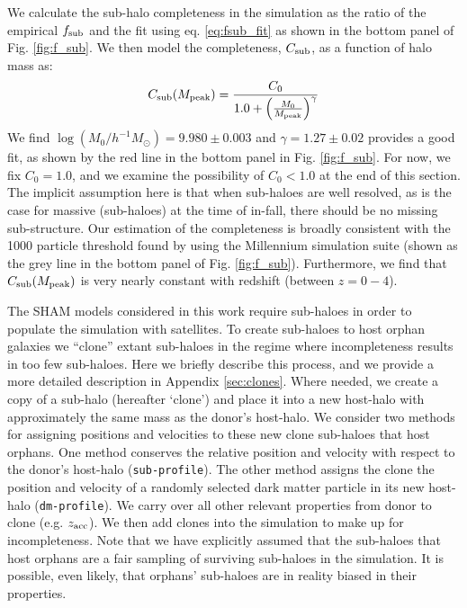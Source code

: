 \documentclass[useAMS,fleqn,usenatbib]{mnras}
\begin{document}
We calculate the sub-halo completeness in the simulation as the ratio of the empirical $f_{\rm sub}$ and the fit using eq. \ref{eq:fsub_fit} as shown in the bottom panel of Fig. \ref{fig:f_sub}.  We then model the completeness, $C_{\rm sub}$, as a function of halo mass as:
%
\begin{equation}
\label{eq:sub_completeness}
C_{\rm sub}(M_{\rm peak}) = \frac{C_0}{1.0 + \left(\frac{M_0}{M_{\rm peak}}\right)^{\gamma}}
\end{equation}
%
We find $\log(M_0/h^{-1}M_{\odot})=9.980\pm0.003$ and $\gamma=1.27 \pm 0.02$ provides a good fit, as shown by the red line in the bottom panel in Fig. \ref{fig:f_sub}.  For now, we fix $C_0=1.0$, and we examine the possibility of $C_0<1.0$ at the end of this section.  The implicit assumption here is that when sub-haloes are well resolved, as is the case for massive (sub-haloes) at the time of in-fall, there should be no missing sub-structure.  Our estimation of the completeness is broadly consistent with the 1000 particle threshold found by \citet{Guo:2013fm} using the Millennium simulation suite (shown as the grey line in the bottom panel of Fig. \ref{fig:f_sub}).  Furthermore, we find that $C_{\rm sub}(M_{\rm peak})$ is very nearly constant with redshift (between $z=0-4$).  

The SHAM models considered in this work require sub-haloes in order to populate the simulation with satellites.  To create sub-haloes to host orphan galaxies we ``clone'' extant sub-haloes in the regime where incompleteness results in too few sub-haloes.  Here we briefly describe this process, and we provide a more detailed description in Appendix \ref{sec:clones}.  Where needed, we create a copy of a sub-halo (hereafter `clone') and place it into a new host-halo with approximately the same mass as the donor's host-halo.  We consider two methods for assigning positions and velocities to these new clone sub-haloes that host orphans.  One method conserves the relative position and velocity with respect to the donor's host-halo ({\tt sub-profile}).  The other method assigns the clone the position and velocity of a randomly selected dark matter particle in its new host-halo ({\tt dm-profile}).  We carry over all other relevant properties from donor to clone (e.g. $z_{\rm acc}$). We then add clones into the simulation to make up for incompleteness. Note that we have explicitly assumed that the sub-haloes that host orphans are a fair sampling of surviving sub-haloes in the simulation.  It is possible, even likely, that orphans' sub-haloes are in reality biased in their properties.
\end{document}
